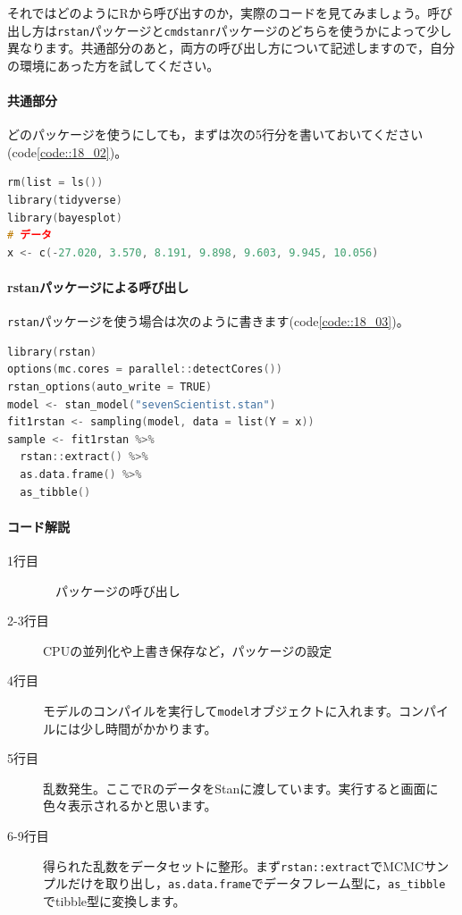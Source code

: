 \documentclass{ltjsbook}
\begin{document}
それではどのようにRから呼び出すのか，実際のコードを見てみましょう。呼び出し方は\texttt{rstan}パッケージと\texttt{cmdstanr}パッケージのどちらを使うかによって少し異なります。共通部分のあと，両方の呼び出し方について記述しますので，自分の環境にあった方を試してください。
\paragraph{共通部分}
どのパッケージを使うにしても，まずは次の5行分を書いておいてください(code\ref{code::18_02})。

\begin{lstlisting}[language=C++,label={code::18_02},caption={環境の準備と共通部分}]
rm(list = ls())
library(tidyverse)
library(bayesplot)
# データ
x <- c(-27.020, 3.570, 8.191, 9.898, 9.603, 9.945, 10.056)
\end{lstlisting}

\paragraph{rstanパッケージによる呼び出し}

\texttt{rstan}パッケージを使う場合は次のように書きます(code\ref{code::18_03})。

\begin{lstlisting}[language=C++,label={code::18_03},caption={rstanパッケージによる呼び出し}]
library(rstan)
options(mc.cores = parallel::detectCores())
rstan_options(auto_write = TRUE)
model <- stan_model("sevenScientist.stan")
fit1rstan <- sampling(model, data = list(Y = x))
sample <- fit1rstan %>%
  rstan::extract() %>%
  as.data.frame() %>%
  as_tibble()
\end{lstlisting}
\paragraph{コード解説}
\begin{description}
    \item[1行目]　パッケージの呼び出し
    \item[2-3行目] CPUの並列化や上書き保存など，パッケージの設定
    \item[4行目] モデルのコンパイルを実行して\texttt{model}オブジェクトに入れます。コンパイルには少し時間がかかります。
    \item[5行目] 乱数発生。ここでRのデータをStanに渡しています。実行すると画面に色々表示されるかと思います。
    \item[6-9行目] 得られた乱数をデータセットに整形。まず\texttt{rstan::extract}でMCMCサンプルだけを取り出し，\texttt{as.data.frame}でデータフレーム型に，\verb|as_tibble|でtibble型に変換します。
\end{description}
\end{document}
